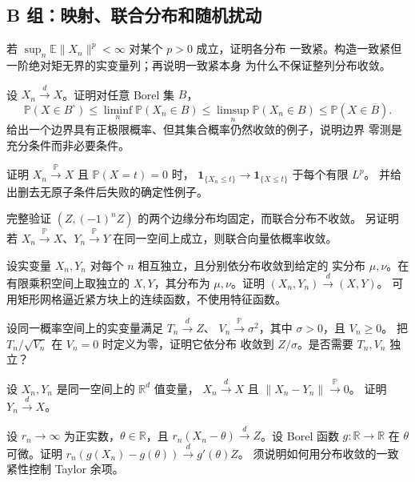 \subsection*{B 组：映射、联合分布和随机扰动}
\begin{enumerate}[label=\textbf{\thechapter.\arabic*.},resume]
若 $\sup_n\mathbb E\|X_n\|^p<\infty$ 对某个 $p>0$ 成立，证明各分布
一致紧。构造一致紧但一阶绝对矩无界的实变量列；再说明一致紧本身
为什么不保证整列分布收敛。

设 $X_n\xrightarrow dX$。证明对任意 Borel 集 $B$，
\[
 \mathbb P(X\in B^\circ)\le\liminf_n\mathbb P(X_n\in B)
 \le\limsup_n\mathbb P(X_n\in B)\le\mathbb P(X\in\overline B).
\]
给出一个边界具有正极限概率、但其集合概率仍然收敛的例子，说明边界
零测是充分条件而非必要条件。

证明 $X_n\xrightarrow{\mathbb P}X$ 且 $\mathbb P(X=t)=0$ 时，
$\mathbf1_{\{X_n\le t\}}\to\mathbf1_{\{X\le t\}}$ 于每个有限 $L^p$。
并给出删去无原子条件后失败的确定性例子。

完整验证 $(Z,(-1)^nZ)$ 的两个边缘分布均固定，而联合分布不收敛。
另证明若 $X_n\xrightarrow{\mathbb P}X$、$Y_n\xrightarrow{\mathbb P}Y$
在同一空间上成立，则联合向量依概率收敛。

设实变量 $X_n,Y_n$ 对每个 $n$ 相互独立，且分别依分布收敛到给定的
实分布 $\mu,\nu$。在有限乘积空间上取独立的 $X,Y$，其分布为
$\mu,\nu$。证明 $(X_n,Y_n)\xrightarrow d(X,Y)$。
可用矩形网格逼近紧方块上的连续函数，不使用特征函数。

设同一概率空间上的实变量满足 $T_n\xrightarrow d Z$、
$V_n\xrightarrow{\mathbb P}\sigma^2$，其中 $\sigma>0$，且 $V_n\ge0$。
把 $T_n/\sqrt{V_n}$ 在 $V_n=0$ 时定义为零，证明它依分布
收敛到 $Z/\sigma$。是否需要 $T_n,V_n$ 独立？

设 $X_n,Y_n$ 是同一空间上的 $\mathbb R^d$ 值变量，
$X_n\xrightarrow dX$ 且 $\|X_n-Y_n\|\xrightarrow{\mathbb P}0$。
证明 $Y_n\xrightarrow dX$。

设 $r_n\to\infty$ 为正实数，$\theta\in\mathbb R$，且
$r_n(X_n-\theta)\xrightarrow dZ$。设 Borel 函数 $g:\mathbb R\to\mathbb R$
在 $\theta$ 可微。证明
$r_n(g(X_n)-g(\theta))\xrightarrow d g'(\theta)Z$。
须说明如何用分布收敛的一致紧性控制 Taylor 余项。
\end{enumerate}

